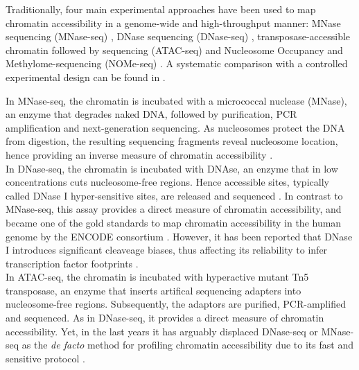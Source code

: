 Traditionally, four main experimental approaches have been used to map chromatin accessibility in a genome-wide and high-throughput manner: MNase sequencing (MNase-seq) \cite{Kaplan2008}, DNase sequencing (DNase-seq) \cite{Song2010}, transposase-accessible chromatin followed by sequencing (ATAC-seq) \cite{Buenrostro2013} and Nucleosome Occupancy and Methylome-sequencing (NOMe-seq) \cite{Kelly2012}. A systematic comparison with a controlled experimental design can be found in \cite{Nordstrom2019}.

In MNase-seq, the chromatin is incubated with a micrococcal nuclease (MNase), an enzyme that degrades naked DNA, followed by purification, PCR amplification and next-generation sequencing. As nucleosomes protect the DNA from digestion, the resulting sequencing fragments reveal nucleosome location, hence providing an inverse measure of chromatin accessibility \cite{Kaplan2008}.\\

In DNase-seq, the chromatin is incubated with DNAse, an enzyme that in low concentrations cuts nucleosome-free regions. Hence accessible sites, typically called DNase I hyper-sensitive sites, are released and sequenced \cite{Song2010}. In contrast to MNase-seq, this assay provides a direct measure of chromatin accessibility, and became one of the gold standards to map chromatin accessibility in the human genome by the ENCODE consortium \cite{ENCODE2012,Thurman2012}. However, it has been reported that DNase I introduces significant cleaveage biases, thus affecting its reliability to infer transcription factor footprints \cite{He2013}.\\

In ATAC-seq, the chromatin is incubated with hyperactive mutant Tn5 transposase, an enzyme that inserts artifical sequencing adapters into nucleosome-free regions. Subsequently, the adaptors are purified, PCR-amplified  and sequenced. As in DNase-seq, it provides a direct measure of chromatin accessibility. Yet, in the last years it has arguably displaced DNase-seq or MNase-seq as the \textit{de facto} method for profiling chromatin accessibility due to its fast and sensitive protocol \cite{Buenrostro2015b,Tsompana2014,Nordstrom2019}.\\

